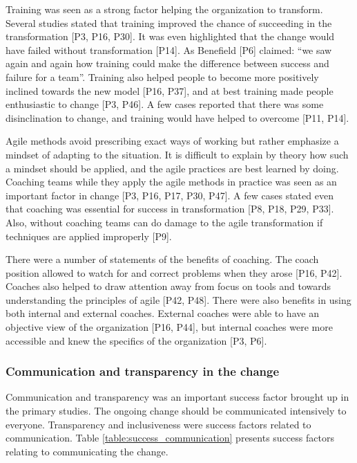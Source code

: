 Training was seen as a strong factor helping the organization to transform.
Several studies stated that training improved the chance of succeeding in the
transformation [P3, P16, P30]. It was even highlighted that the change would have
failed without transformation [P14]. As Benefield [P6] claimed: ``we saw again
and again how training could make the difference between success and failure for
a team''. Training also helped people to become more positively inclined towards
the new model [P16, P37], and at best training made people enthusiastic to change
[P3, P46]. A few cases reported that there was some disinclination to change,
and training would have helped to overcome [P11, P14].

Agile methods avoid prescribing exact ways of working but rather emphasize a
mindset of adapting to the situation. It is difficult to explain by theory how
such a mindset should be applied, and the agile practices are best learned by
doing. Coaching teams while they apply the agile methods in practice was seen as
an important factor in change [P3, P16, P17, P30, P47]. A few cases stated even
that coaching was essential for success in transformation [P8, P18, P29, P33].
Also, without coaching teams can do damage to the agile transformation if
techniques are applied improperly [P9].

There were a number of statements of the benefits of coaching. The coach
position allowed to watch for and correct problems when they arose [P16, P42].
Coaches also helped to draw attention away from focus on tools and towards
understanding the principles of agile [P42, P48].
There were also benefits in using both internal and external coaches.
External coaches were able to have an objective view of the organization [P16,
P44], but internal coaches were more accessible and knew the specifics of the
organization [P3, P6].


\subsubsection{Communication and transparency in the change}

Communication and transparency was an important success factor brought up in the
primary studies. The ongoing change should be communicated intensively to
everyone. Transparency and inclusiveness were success factors related to
communication.
Table \ref{table:success_communication} presents success factors relating to
communicating the change.

